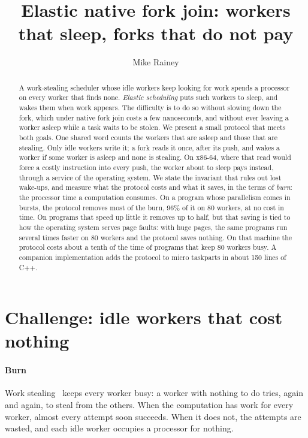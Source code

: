 \documentclass[sigplan,nonacm]{acmart}
\title{Elastic native fork join: workers that sleep, forks that do not pay}
\author{Mike Rainey}
\begin{document}
\begin{abstract}
A work-stealing scheduler whose idle workers keep looking for work
spends a processor on every worker that finds none.
%
\emph{Elastic scheduling} puts such workers to sleep, and wakes them
when work appears.
%
The difficulty is to do so without slowing down the fork, which under
native fork join costs a few nanoseconds, and without ever leaving a
worker asleep while a task waits to be stolen.
%
We present a small protocol that meets both goals.
%
One shared word counts the workers that are asleep and those that are
stealing.
%
Only idle workers write it; a fork reads it once, after its push, and
wakes a worker if some worker is asleep and none is stealing.
%
On x86-64, where that read would force a costly instruction into every
push, the worker about to sleep pays instead, through a service of the
operating system.
%
We state the invariant that rules out lost wake-ups, and measure what
the protocol costs and what it saves, in the terms of \emph{burn}: the
processor time a computation consumes.
%
On a program whose parallelism comes in bursts, the protocol removes
most of the burn, 96\% of it on 80 workers, at no cost in time.
%
On programs that speed up little it removes up to half, but that
saving is tied to how the operating system serves page faults: with
huge pages, the same programs run several times faster on 80 workers
and the protocol saves nothing.
%
On that machine the protocol costs about a tenth of the time of
programs that keep 80 workers busy.
%
A companion implementation adds the protocol to micro taskparts in
about 150 lines of C++.
\end{abstract}

\maketitle

\section{Challenge: idle workers that cost nothing}

\paragraph{Burn}
%
Work stealing~\cite{blumofele99,arora98} keeps every worker busy: a
worker with nothing to do tries, again and again, to steal from the
others.
%
When the computation has work for every worker, almost every attempt
soon succeeds.
%
When it does not, the attempts are wasted, and each idle worker
occupies a processor for nothing.
\end{document}
